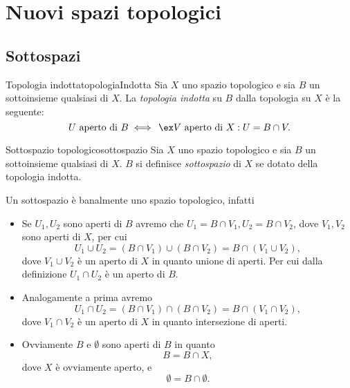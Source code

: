 %
%
\chapter{Nuovi spazi topologici}
\section{Sottospazi}

\begin{defn}{Topologia indotta}{topologiaIndotta}
	Sia \(X\) uno spazio topologico e sia \(B\) un sottoinsieme qualsiasi di \(X\).
	La \emph{topologia indotta} su \(B\) dalla topologia su \(X\) è la seguente:
	\[
		U\text{ aperto di }B\iff\,\ex V\text{ aperto di } X:U=B\cap V.
	\]
\end{defn}

\begin{defn}{Sottospazio topologico}{sottospazio}
	Sia \(X\) uno spazio topologico e sia \(B\) un sottoinsieme qualsiasi di \(X\).
	\(B\) si definisce \emph{sottospazio} di \(X\) se dotato della topologia indotta.
\end{defn}

\begin{oss}
	Un sottospazio è banalmente uno spazio topologico, infatti
	\begin{itemize}
		\item Se \(U_1,U_2\) sono aperti di \(B\) avremo che \(U_1=B\cap V_1,U_2=B\cap V_2\), dove \(V_1,V_2\) sono aperti di \(X\), per cui
		      \[
			      U_1\cup U_2=(B\cap V_1)\cup(B\cap V_2)=B\cap(V_1\cup V_2),
		      \]
		      dove \(V_1\cup V_2\) è un aperto di \(X\) in quanto unione di aperti.
		      Per cui dalla definizione \(U_1\cap U_2\) è un aperto di \(B\).
		\item Analogamente a prima avremo
		      \[
			      U_1\cap U_2=(B\cap V_1)\cap (B\cap V_2)=B\cap(V_1\cap V_2),
		      \]
		      dove \(V_1\cap V_2\) è un aperto di \(X\) in quanto intersezione di aperti.
		\item Ovviamente \(B\) e \(\emptyset\) sono aperti di \(B\) in quanto
		      \[
			      B=B\cap X,
		      \]
		      dove \(X\) è ovviamente aperto, e
		      \[
			      \emptyset=B\cap \emptyset.
		      \]
	\end{itemize}
\end{oss}

